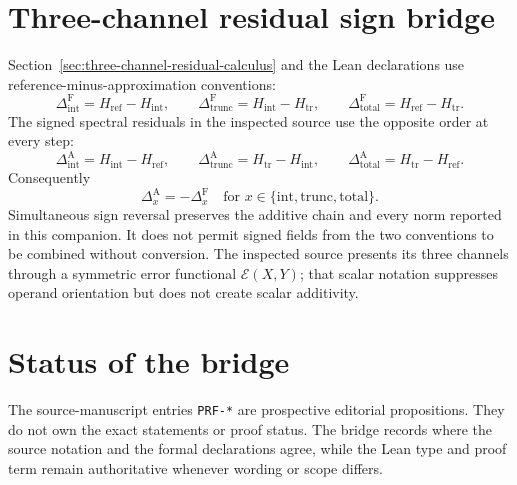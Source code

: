 \section{Three-channel residual sign bridge}

Section~\ref{sec:three-channel-residual-calculus} and the Lean declarations use
reference-minus-approximation conventions:
\[
  \Delta_{\mathrm{int}}^{\mathrm F}=H_{\mathrm{ref}}-H_{\mathrm{int}},\qquad
  \Delta_{\mathrm{trunc}}^{\mathrm F}=H_{\mathrm{int}}-H_{\mathrm{tr}},\qquad
  \Delta_{\mathrm{total}}^{\mathrm F}=H_{\mathrm{ref}}-H_{\mathrm{tr}}.
\]
The signed spectral residuals in the inspected  source use the opposite
order at every step:
\[
  \Delta_{\mathrm{int}}^{\mathrm A}=H_{\mathrm{int}}-H_{\mathrm{ref}},\qquad
  \Delta_{\mathrm{trunc}}^{\mathrm A}=H_{\mathrm{tr}}-H_{\mathrm{int}},\qquad
  \Delta_{\mathrm{total}}^{\mathrm A}=H_{\mathrm{tr}}-H_{\mathrm{ref}}.
\]
Consequently
\[
  \Delta_x^{\mathrm A}=-\Delta_x^{\mathrm F}
  \quad\text{for }x\in\{\mathrm{int},\mathrm{trunc},\mathrm{total}\}.
\]
Simultaneous sign reversal preserves the additive chain and every norm reported in this
companion.  It does not permit signed fields from the two conventions to be combined
without conversion.  The inspected  source presents its three
channels through a symmetric error functional $\mathcal E(X,Y)$; that scalar notation
suppresses operand orientation but does not create scalar additivity.

\section{Status of the bridge}

The source-manuscript entries \texttt{PRF-*} are prospective editorial propositions.
They do not own the exact statements or proof status. The bridge records where the
source notation and the formal declarations agree, while the Lean type and proof term
remain authoritative whenever wording or scope differs.
